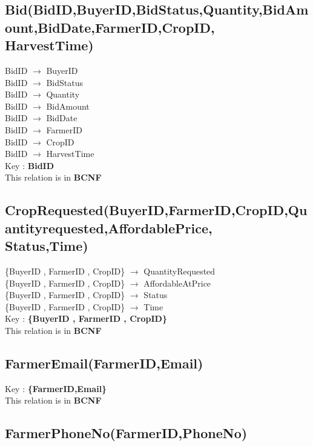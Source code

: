 \documentclass{article}
\begin{document}
 \subsection*{Bid(BidID,BuyerID,BidStatus,Quantity,BidAmount,BidDate,FarmerID,CropID,\\HarvestTime)}
BidID $\longrightarrow$  BuyerID        \\
BidID $\longrightarrow$  BidStatus        \\
BidID $\longrightarrow$  Quantity        \\
BidID $\longrightarrow$  BidAmount       \\
BidID $\longrightarrow$  BidDate        \\
BidID $\longrightarrow$  FarmerID        \\
BidID $\longrightarrow$  CropID        \\
BidID $\longrightarrow$  HarvestTime        \\

Key : \textbf{BidID}        \\
This relation is in \textbf{BCNF}

\subsection*{CropRequested(BuyerID,FarmerID,CropID,Quantityrequested,AffordablePrice,\\Status,Time)}
 \{BuyerID , FarmerID , CropID\} $\longrightarrow$  QuantityRequested \\
 \{BuyerID , FarmerID , CropID\} $\longrightarrow$  AffordableAtPrice \\
 \{BuyerID , FarmerID , CropID\} $\longrightarrow$  Status \\
 \{BuyerID , FarmerID , CropID\} $\longrightarrow$  Time \\

Key : \textbf{\{BuyerID , FarmerID , CropID\}}\\
This relation is in \textbf{BCNF}


 \subsection*{FarmerEmail(FarmerID,Email)}

Key : \textbf{\{FarmerID,Email\}}\\
This relation is in \textbf{BCNF}
 

 \subsection*{FarmerPhoneNo(FarmerID,PhoneNo)}
\end{document}

